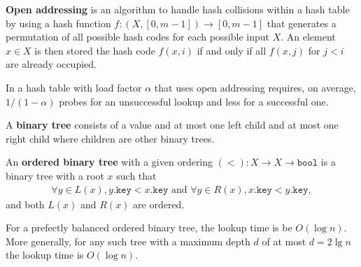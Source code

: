 \documentclass{article}
\begin{document}
\begin{definition}
	\textbf{Open addressing} is an algorithm to handle hash collisions within a hash table 
	by using a hash function $f: (X, [0,m-1]) \to [0,m-1]$ that generates a permutation of all possible
	hash codes for each possible input $X$. An element $x\in X$ is then stored the hash code $f(x, i)$
	if and only if all $f(x,j)$ for $j < i$ are already occupied.
\end{definition}
\begin{proposition}
	In a hash table with load factor $\alpha$ that uses open addressing requires, on average, $1/(1-\alpha)$ 
	probes for an unsuccessful lookup and less for a successful one.
\end{proposition}
\begin{definition}
	A \textbf{binary tree} consists of a value and at most one left child and at most one right child where
	children are other binary trees.
\end{definition}
\begin{definition}
	An \textbf{ordered binary tree} with a given ordering $(<) : X \to X \to \texttt{bool}$ is a binary tree 
	with a root $x$ such that
	\begin{align*}
		\forall y \in L(x), y.\texttt{key} < x.\texttt{key} 
		\text{ and } \forall y \in R(x), x.\texttt{key} < y.\texttt{key},
	\end{align*}
	and both $L(x)$ and $R(x)$ are ordered.
\end{definition}
\begin{proposition}
	For a prefectly balanced ordered binary tree, the lookup time is be $O(\log n)$.\\
	More generally, for any such tree with a maximum depth $d$ of at most $d=2 \lg n$ the
	lookup time is $O(\log n)$.
\end{proposition}
\end{document}
